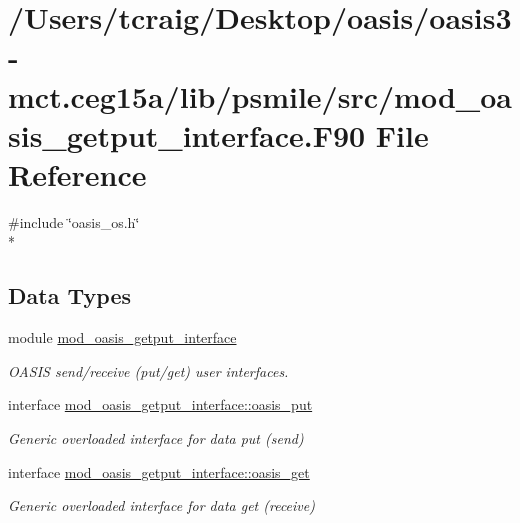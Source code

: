 \hypertarget{mod__oasis__getput__interface_8_f90}{\section{/\+Users/tcraig/\+Desktop/oasis/oasis3-\/mct.ceg15a/lib/psmile/src/mod\+\_\+oasis\+\_\+getput\+\_\+interface.F90 File Reference}
\label{mod__oasis__getput__interface_8_f90}
}
{\ttfamily \#include \char`\"{}oasis\+\_\+os.\+h\char`\"{}}\\*
\subsection*{Data Types}
\begin{DoxyCompactItemize}
\item 
module \hyperlink{classmod__oasis__getput__interface}{mod\+\_\+oasis\+\_\+getput\+\_\+interface}
\begin{DoxyCompactList}\small\item\em O\+A\+S\+I\+S send/receive (put/get) user interfaces. \end{DoxyCompactList}\item 
interface \hyperlink{interfacemod__oasis__getput__interface_1_1oasis__put}{mod\+\_\+oasis\+\_\+getput\+\_\+interface\+::oasis\+\_\+put}
\begin{DoxyCompactList}\small\item\em Generic overloaded interface for data put (send) \end{DoxyCompactList}\item 
interface \hyperlink{interfacemod__oasis__getput__interface_1_1oasis__get}{mod\+\_\+oasis\+\_\+getput\+\_\+interface\+::oasis\+\_\+get}
\begin{DoxyCompactList}\small\item\em Generic overloaded interface for data get (receive) \end{DoxyCompactList}\end{DoxyCompactItemize}
